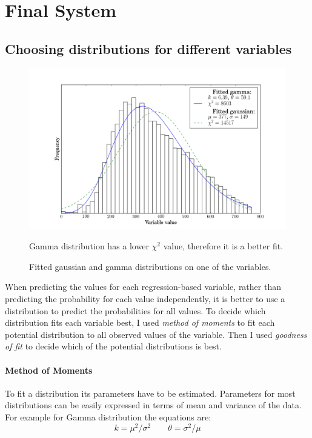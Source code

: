 \documentclass[12pt,a4paper]{book}
\newcommand\note[1]{\vspace*{-0.5\baselineskip}\caption*{#1}}
\begin{document}
\section{Final System}
\subsection{Choosing distributions for different variables}
\label{distribution-selection}
\begin{figure}[ht]
\centering
\includegraphics[scale=0.5]{fitted-distributions}
\caption{Fitted gaussian and gamma distributions on one of the variables.}
\note{Gamma distribution has a lower $\chi^2$ value, therefore it is a better fit.}
\label{fig:fitted-distributions}
\end{figure}
When predicting the values for each regression-based variable, rather than predicting the probability for each value independently, it is better to use a distribution to predict the probabilities for all values.
To decide which distribution fits each variable best, I used \emph{method of moments} to fit each potential distribution to all observed values of the variable.
Then I used \emph{goodness of fit} to decide which of the potential distributions is best.
\paragraph{Method of Moments}
To fit a distribution its parameters have to be estimated.
Parameters for most distributions can be easily expressed in terms of mean and variance of the data.
For example for Gamma distribution the equations are:
\begin{equation*}
k= \mu^2/\sigma^2
\qquad
\theta = \sigma^2/\mu
\end{equation*}
\end{document}
